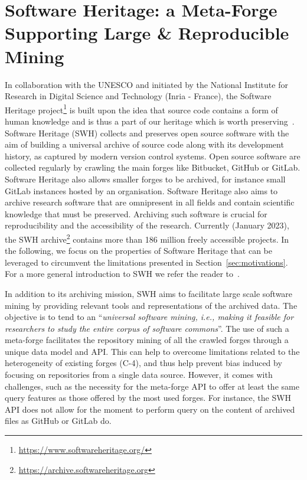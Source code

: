 \section{Software Heritage: a Meta-Forge Supporting Large \& Reproducible Mining}
\label{sec:soft_heritage}
In collaboration with the UNESCO and initiated by the National Institute for Research in Digital Science and Technology (Inria - France), the Software Heritage project\footnote{\url{https://www.softwareheritage.org/}} is built upon the idea that source code contains a form of human knowledge and is thus a part of our heritage which is worth preserving~\cite{di2017software}.
Software Heritage (SWH) collects and preserves open source software with the aim of building a universal archive of source code along with its development history, as captured by modern version control systems. Open source software are collected regularly by crawling the main forges like Bitbucket, GitHub or GitLab. Software Heritage also allows smaller forges to be archived, for instance small GitLab instances hosted by an organisation.
Software Heritage also aims to archive research software that are omnipresent in all fields and contain scientific knowledge that must be preserved. Archiving such software is crucial for reproducibility and the accessibility of the research.
Currently (January 2023), the SWH archive\footnote{\url{https://archive.softwareheritage.org}} contains more than 186 million freely accessible projects.
In the following, we focus on the properties of Software Heritage that can be leveraged to circumvent the limitations presented in Section~\ref{sec:motivations}. For a more general introduction to SWH we refer the reader to~\cite{di2017software}.

In addition to its archiving mission, SWH aims to facilitate large scale software mining by providing relevant tools and representations of the archived data. 
The objective is to tend to an ``\emph{universal software mining, i.e., making it feasible for researchers to study the entire corpus of software commons}''. 
The use of such a meta-forge facilitates the repository mining of all the crawled forges  through a unique data model and API.
This can help to overcome limitations related to the heterogeneity of existing forges (C-4), and thus help prevent bias induced by focusing on repositories from a single data source.
However, it comes with challenges, such as the necessity for the meta-forge API to offer at least the same query features as those offered by the most used forges.  
For instance, the SWH API does not allow for the moment to perform query on the content of archived files as GitHub or GitLab do. 


